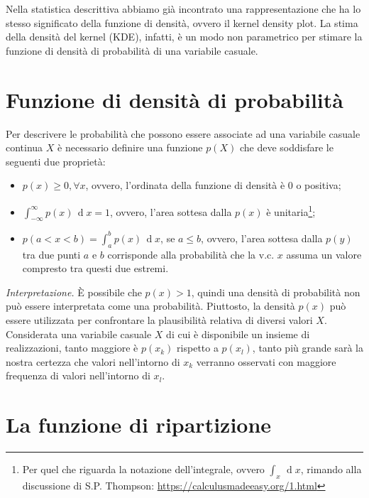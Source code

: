 \documentclass[
  11pt,
]{krantz}
\theoremstyle{definition}
\theoremstyle{definition}
\theoremstyle{definition}
\theoremstyle{definition}
\theoremstyle{remark}
\begin{document}
Nella statistica descrittiva abbiamo già incontrato una rappresentazione che ha lo stesso significato della funzione di densità, ovvero il kernel density plot. La stima della densità del kernel (KDE), infatti, è un modo non parametrico per stimare la funzione di densità di probabilità di una variabile casuale.

\hypertarget{funzione-di-densituxe0-di-probabilituxe0}{%
\section{Funzione di densità di probabilità}\label{funzione-di-densituxe0-di-probabilituxe0}}

Per descrivere le probabilità che possono essere associate ad una variabile casuale continua \(X\) è necessario definire una funzione \(p(X)\) che deve soddisfare le seguenti due proprietà:

\begin{itemize}
\item
  \(p(x) \geq 0, \forall x\), ovvero, l'ordinata della funzione di densità è 0 o positiva;
\item
  \(\int_{-\infty}^{\infty} p(x) \,\operatorname {d}\!x = 1\), ovvero, l'area sottesa dalla \(p(x)\) è unitaria\footnote{Per quel che riguarda la notazione dell'integrale, ovvero \(\int_x \,\operatorname {d}\!x\), rimando alla discussione di S.P. Thompson: \url{https://calculusmadeeasy.org/1.html}};
\item
  \(p(a < x < b) = \int_a^b p(x) \,\operatorname {d}\!x\), se \(a \leq b\), ovvero, l'area sottesa dalla \(p(y)\) tra due punti \(a\) e \(b\) corrisponde alla probabilità che la v.c. \(x\) assuma un valore compresto tra questi due estremi.
\end{itemize}

\emph{Interpretazione.} È possibile che \(p(x) > 1\), quindi una densità di probabilità non può essere interpretata come una probabilità. Piuttosto, la densità \(p(x)\) può essere utilizzata per confrontare la plausibilità relativa di diversi valori \(X\). Considerata una variabile casuale \(X\) di cui è disponibile un insieme di realizzazioni, tanto maggiore è \(p(x_k)\) rispetto a \(p(x_l)\), tanto più grande sarà la nostra certezza che valori nell'intorno di \(x_k\) verranno osservati con maggiore frequenza di valori nell'intorno di \(x_l\).

\hypertarget{la-funzione-di-ripartizione}{%
\section{La funzione di ripartizione}\label{la-funzione-di-ripartizione}}
\end{document}
